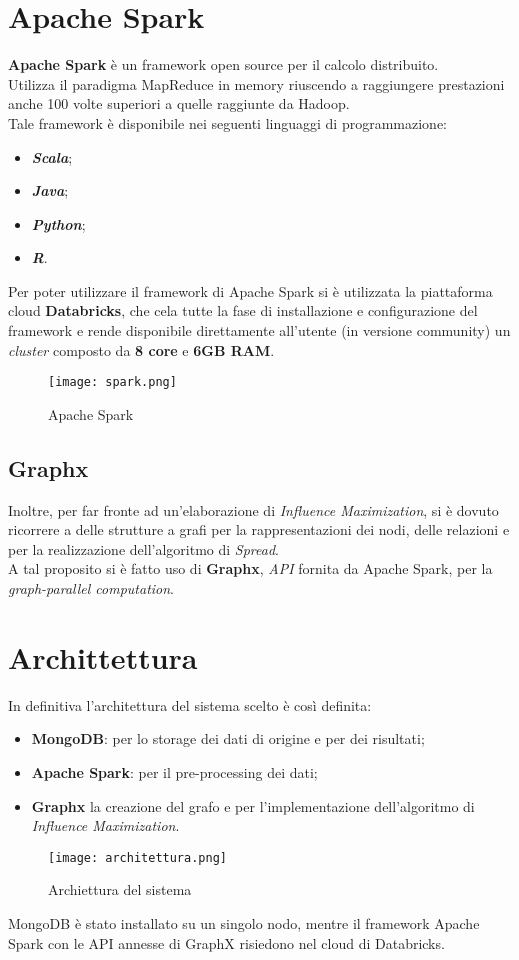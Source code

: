 \section{Apache Spark}
\textbf{Apache Spark} è un framework open source per il calcolo distribuito.\\
Utilizza il paradigma MapReduce in memory riuscendo a raggiungere prestazioni
anche 100 volte superiori a quelle raggiunte da Hadoop.\\
Tale framework è disponibile nei seguenti linguaggi di programmazione:
\begin{itemize}
	\item \textit{\textbf{Scala}};
	\item \textit{\textbf{Java}};
	\item \textit{\textbf{Python}};
	\item \textit{\textbf{R}}.
\end{itemize}
Per poter utilizzare il framework di Apache Spark si è utilizzata la piattaforma
cloud \textbf{Databricks}, che cela tutte la fase di installazione e configurazione
del framework e rende disponibile direttamente all'utente (in versione community)
un \textit{cluster} composto da \textbf{8 core} e \textbf{6GB RAM}.
\begin{figure}[!htbp]
	\texttt{[image: spark.png]}
  \caption{Apache Spark}
  \label{}
\end{figure}

\subsection{Graphx}
Inoltre, per far fronte ad un'elaborazione di \textit{Influence Maximization},
si è dovuto ricorrere a delle strutture a grafi per la rappresentazioni dei nodi,
delle relazioni e per la realizzazione dell'algoritmo di \textit{Spread}.\\
A tal proposito si è fatto uso di \textbf{Graphx}, \textit{API} fornita da Apache
Spark, per la \textit{graph-parallel computation}.

\section{Archittettura}
In definitiva l'architettura del sistema scelto è così definita:
\begin{itemize}
	\item \textbf{MongoDB}: per lo storage dei dati di origine e per dei risultati;
	\item \textbf{Apache Spark}: per il pre-processing dei dati;
	\item \textbf{Graphx} la creazione del grafo e per l'implementazione dell'algoritmo
	 di \textit{Influence Maximization}.
\end{itemize}

\begin{figure}[!htbp]
	\texttt{[image: architettura.png]}
  \caption{Archiettura del sistema}
  \label{sysarch}
\end{figure}

MongoDB è stato installato su un singolo nodo, mentre il framework Apache
Spark con le API annesse di GraphX risiedono nel cloud di Databricks.\\
